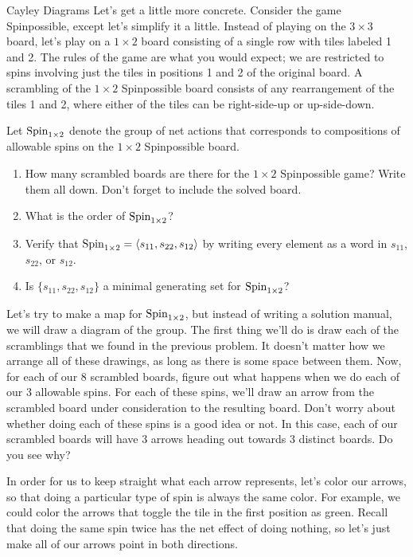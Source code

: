 \begin{section}{Cayley Diagrams}
Let's get a little more concrete.  Consider the game Spinpossible, except let's simplify it a little.  Instead of playing on the $3\times 3$ board, let's play on a $1\times 2$ board consisting of a single row with tiles labeled 1 and 2.  The rules of the game are what you would expect; we are restricted to spins involving just the tiles in positions 1 and 2 of the original board.  A scrambling of the $1\times 2$ Spinpossible board consists of any rearrangement of the tiles 1 and 2, where either of the tiles can be right-side-up or up-side-down.  

\begin{problem}
Let $\operatorname{Spin}_{1\times 2}$ denote the group of net actions that corresponds to compositions of allowable spins on the $1\times 2$ Spinpossible board.
\begin{enumerate}[label=\textrm{(\alph*)}]
\item How many scrambled boards are there for the $1\times 2$ Spinpossible game?  Write them all down. Don't forget to include the solved board.
\item What is the order of $\operatorname{Spin}_{1\times 2}$?
\item Verify that $\operatorname{Spin}_{1\times 2}=\langle s_{11}, s_{22}, s_{12}\rangle$ by writing every element as a word in $s_{11}$, $s_{22}$, or $s_{12}$.
\item Is $\{s_{11}, s_{22}, s_{12}\}$ a minimal generating set for $\operatorname{Spin}_{1\times 2}$?
\end{enumerate}
\end{problem}

Let's try to make a map for $\operatorname{Spin}_{1\times 2}$, but instead of writing a solution manual, we will draw a diagram of the group.  The first thing we'll do is draw each of the scramblings that we found in the previous problem.  It doesn't matter how we arrange all of these drawings, as long as there is some space between them.  Now, for each of our 8 scrambled boards, figure out what happens when we do each of our 3 allowable spins.  For each of these spins, we'll draw an arrow from the scrambled board under consideration to the resulting board.  Don't worry about whether doing each of these spins is a good idea or not.  In this case, each of our scrambled boards will have 3 arrows heading out towards 3 distinct boards.  Do you see why?  

In order for us to keep straight what each arrow represents, let's color our arrows, so that doing a particular type of spin is always the same color.  For example, we could color the arrows that toggle the tile in the first position as {\color{cb-green}green}.  Recall that doing the same spin twice has the net effect of doing nothing, so let's just make all of our arrows point in both directions.


\end{section}
